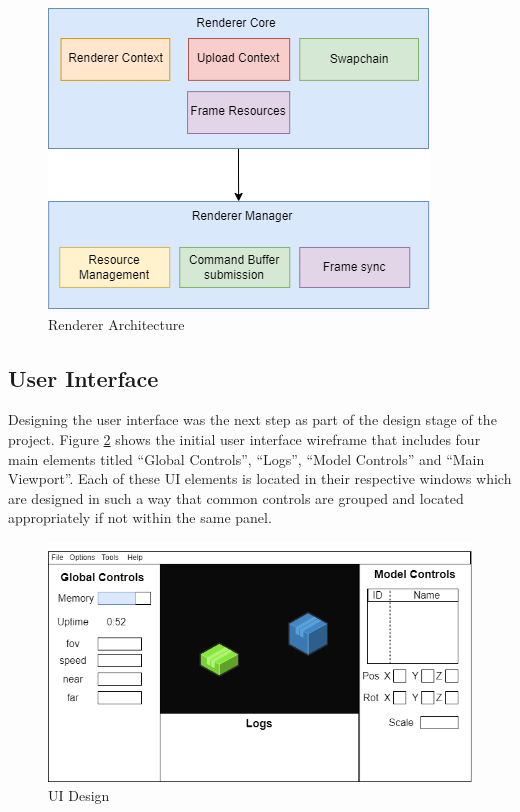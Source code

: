 \documentclass[11pt]{article}
\begin{document}
\begin{figure}[H]
  \centering
  \includegraphics[width=\textwidth]{images/renderer_architecture.png}
  \caption{Renderer Architecture}
  \label{fig:rendererarch}
\end{figure}

\subsection{User Interface}
Designing the user interface was the next step as part of the design stage of
the project. Figure \ref{fig:ui_design} shows the initial user interface
wireframe that includes four main elements titled ``Global Controls'', ``Logs'',
``Model Controls'' and ``Main Viewport''. Each of these UI elements is located
in their respective windows which are designed in such a way that common
controls are grouped and located appropriately if not within the same panel.

\begin{figure}[H]
  \centering
  \includegraphics[width=\textwidth]{images/ui_design.png}
  \caption{UI Design}
  \label{fig:ui_design}
\end{figure}
\end{document}
